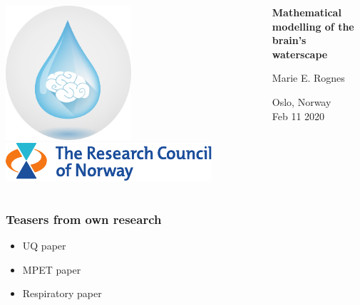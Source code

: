 \documentclass[mathserif, aspectratio=169]{beamer}
\begin{document}
\begin{frame}
\begin{columns}
\begin{column}{0.25\textwidth}
    \vspace{1em}
    \includegraphics[width=0.5\textwidth]{graphics/waterscape_logo.png} \\
    \vspace{1em}
    \includegraphics[width=\textwidth]{graphics/rcn-logo.pdf} \\
    \end{column}
    \begin{column}{0.75\textwidth}
    {
    \centering

      \vspace{4em}

      {\bf Mathematical modelling of the brain's waterscape} \\

      \bigskip
      \bigskip
      
      Marie E. Rognes \\
      \bigskip
      \bigskip

      Oslo, Norway \\
      \medskip
      Feb 11 2020 \\
      }
    \end{column}
  \end{columns}
\end{frame}

\cleanpage

\begin{frame}
\frametitle{Teasers from own research}

\begin{itemize}
\item
  UQ paper
\item
  MPET paper
\item
  Respiratory paper
\end{itemize}
\end{frame}
\end{document}
